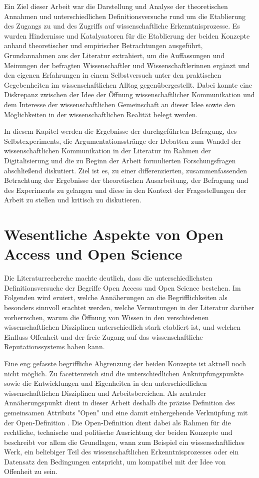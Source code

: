 Ein Ziel dieser Arbeit war die Darstellung und Analyse der theoretischen Annahmen und unterschiedlichen Definitionsversuche rund um die Etablierung des Zugangs zu und des Zugriffs auf wissenschaftliche Erkenntnisprozesse. Es wurden Hindernisse und Katalysatoren für die Etablierung der beiden Konzepte anhand theoretischer und empirischer Betrachtungen ausgeführt, Grundannahmen aus der Literatur extrahiert, um die Auffassungen und Meinungen der befragten Wissenschaftler und Wissenschaftlerinnen ergänzt und den eigenen Erfahrungen in einem Selbstversuch unter den praktischen Gegebenheiten im wissenschaftlichen Alltag gegenübergestellt. Dabei konnte eine Diskrepanz zwischen der Idee der Öffnung wissenschaftlicher Kommunikation und dem Interesse der wissenschaftlichen Gemeinschaft an dieser Idee sowie den Möglichkeiten in der wissenschaftlichen Realität belegt werden.

In diesem Kapitel werden die Ergebnisse der durchgeführten Befragung, des Selbstexperiments, die Argumentationsstränge der Debatten zum Wandel der wissenschaftlichen Kommunikation in der Literatur im Rahmen der Digitalisierung und die zu Beginn der Arbeit formulierten Forschungsfragen abschließend diskutiert. Ziel ist es, zu einer differenzierten, zusammenfassenden Betrachtung der Ergebnisse der theoretischen Ausarbeitung, der Befragung und des Experiments zu gelangen und diese in den Kontext der Fragestellungen der Arbeit zu stellen und kritisch zu diskutieren.

\section{Wesentliche Aspekte von Open Access und Open Science}

Die Literaturrecherche machte deutlich, dass die unterschiedlichsten Definitionsversuche der Begriffe Open Access und Open Science bestehen. Im Folgenden wird eruiert, welche Annäherungen an die Begrifflichkeiten als besonders sinnvoll erachtet werden, welche Vermutungen in der Literatur darüber vorherrschen, warum die Öffnung von Wissen in den verschiedenen wissenschaftlichen Disziplinen unterschiedlich stark etabliert ist, und welchen Einfluss Offenheit und der freie Zugang auf das wissenschaftliche Reputationssystems haben kann.

Eine eng gefasste begriffliche Abgrenzung der beiden Konzepte ist aktuell noch nicht möglich. Zu facettenreich sind die unterschiedlichen Anknüpfungspunkte sowie die Entwicklungen und Eigenheiten in den unterschiedlichen wissenschaftlichen Disziplinen und Arbeitsbereichen. Als zentraler Annäherungspunkt dient in dieser Arbeit deshalb die präzise Definition des gemeinsamen Attributs "Open" und eine damit einhergehende Verknüpfung mit der Open-Definition \cite{Open_Definition_2014}. Die Open-Definition dient dabei als Rahmen für die rechtliche, technische und politische Ausrichtung der beiden Konzepte und beschreibt vor allem die Grundlagen, wann zum Beispiel ein wissenschaftliches Werk, ein beliebiger Teil des wissenschaftlichen Erkenntnisprozesses oder ein Datensatz den Bedingungen entspricht, um kompatibel mit der Idee von Offenheit zu sein.

